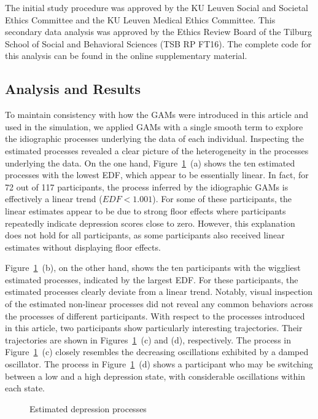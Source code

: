 \documentclass[man, floatsintext]{apa7}
\begin{document}
The initial study procedure was approved by the KU Leuven Social and Societal
Ethics Committee and the KU Leuven Medical Ethics Committee. This secondary
data analysis was approved by the Ethics Review Board of the Tilburg School of
Social and Behavioral Sciences (TSB RP FT16). The complete code for this
analysis can be found in the online supplementary material.

\subsection{Analysis and Results}

To maintain consistency with how the GAMs were introduced in this article and
used in the simulation, we applied GAMs with a single smooth term to explore
the idiographic processes underlying the data of each individual. Inspecting
the estimated processes revealed a clear picture of
the heterogeneity in the processes underlying the data. On the one hand,
Figure~\ref{fig:dem_smooth}~(a) shows the ten estimated processes with the
lowest EDF, which appear to be essentially linear. In fact, for 72 out of 117
participants, the process inferred by the idiographic GAMs is effectively a
linear trend ($EDF < 1.001$). For some of these participants, the linear
estimates appear to be due to strong floor effects where participants
repeatedly indicate depression scores close to zero. However, this explanation
does not hold for all participants, as some participants also received linear
estimates without displaying floor effects.

Figure~\ref{fig:dem_smooth}~(b), on the other hand, shows the ten participants
with the wiggliest estimated processes, indicated by the largest EDF\@. For
these participants, the estimated processes clearly deviate from a linear
trend. Notably, visual inspection of the estimated non-linear processes did not
reveal any common behaviors across the processes of different participants.
With respect to the processes introduced in this article, two participants show
particularly interesting trajectories. Their trajectories are shown in
Figures~\ref{fig:dem_smooth}~(c) and (d), respectively. The process in
Figure~\ref{fig:dem_smooth}~(c) closely resembles the decreasing oscillations
exhibited by a damped oscillator. The process in
Figure~\ref{fig:dem_smooth}~(d) shows a participant who may be switching
between a low and a high depression state, with considerable oscillations
within each state.

\begin{figure}[!t]
  \caption{Estimated depression processes}
  \label{fig:dem_smooth}
\end{figure}
\end{document}
